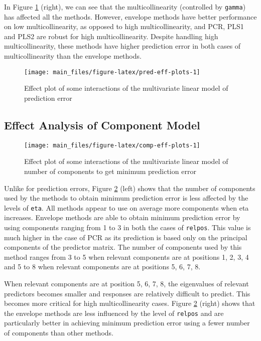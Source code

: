 \documentclass[review]{elsarticle}
\begin{document}
In Figure \ref{fig:pred-eff-plots} (right), we can see that the
multicollinearity (controlled by \texttt{gamma}) has affected all the
methods. However, envelope methods have better performance on low
multicollinearity, as opposed to high multicollinearity, and PCR, PLS1
and PLS2 are robust for high multicollinearity. Despite handling high
multicollinearity, these methods have higher prediction error in both
cases of multicollinearity than the envelope methods.




\begin{figure}
\texttt{[image: main\_files/figure-latex/pred-eff-plots-1]} \caption{Effect plot of some interactions of the multivariate
linear model of prediction error}\label{fig:pred-eff-plots}
\end{figure}

\subsection{Effect Analysis of Component
Model}\label{effect-analysis-of-component-model}




\begin{figure}[!htb]
\texttt{[image: main\_files/figure-latex/comp-eff-plots-1]} \caption{Effect plot of some interactions of the multivariate
linear model of number of components to get minimum prediction error}\label{fig:comp-eff-plots}
\end{figure}

Unlike for prediction errors, Figure \ref{fig:comp-eff-plots} (left)
shows that the number of components used by the methods to obtain
minimum prediction error is less affected by the levels of \texttt{eta}.
All methods appear to use on average more components when eta increases.
Envelope methods are able to obtain minimum prediction error by using
components ranging from 1 to 3 in both the cases of \texttt{relpos}.
This value is much higher in the case of PCR as its prediction is based
only on the principal components of the predictor matrix. The number of
components used by this method ranges from 3 to 5 when relevant
components are at positions 1, 2, 3, 4 and 5 to 8 when relevant
components are at positions 5, 6, 7, 8.

When relevant components are at position 5, 6, 7, 8, the eigenvalues of
relevant predictors becomes smaller and responses are relatively
difficult to predict. This becomes more critical for high
multicollinearity cases. Figure \ref{fig:comp-eff-plots} (right) shows
that the envelope methods are less influenced by the level of
\texttt{relpos} and are particularly better in achieving minimum
prediction error using a fewer number of components than other methods.
\end{document}
